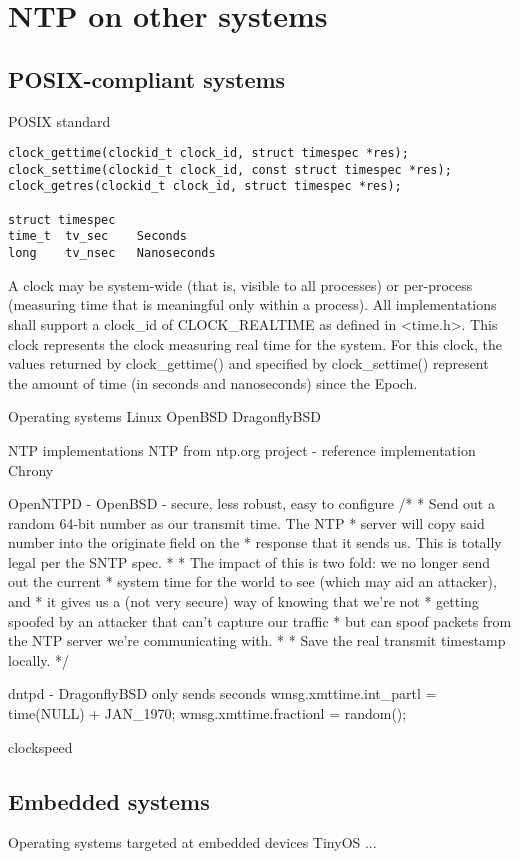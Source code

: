 
\chapter{NTP on other systems}

\section{POSIX-compliant systems}
POSIX standard
\begin{lstlisting}[morekeywords={clockid_t,time_t},numbers=none]
clock_gettime(clockid_t clock_id, struct timespec *res);
clock_settime(clockid_t clock_id, const struct timespec *res);
clock_getres(clockid_t clock_id, struct timespec *res);

struct timespec
time_t  tv_sec    Seconds
long    tv_nsec   Nanoseconds
\end{lstlisting}
A clock may be system-wide (that is, visible to all processes)
or per-process (measuring time that is meaningful only within a process).
All implementations shall support a clock\_id of CLOCK\_REALTIME as
defined in <time.h>.
This clock represents the clock measuring real time for the system.
For this clock, the values returned by clock\_gettime() and specified
by clock\_settime() represent the amount
of time (in seconds and nanoseconds) since the Epoch.


Operating systems
Linux
OpenBSD
DragonflyBSD

NTP implementations
NTP from ntp.org project - reference implementation
Chrony

OpenNTPD - OpenBSD - secure, less robust, easy to configure
	/*
	 * Send out a random 64-bit number as our transmit time.  The NTP
	 * server will copy said number into the originate field on the
	 * response that it sends us.  This is totally legal per the SNTP spec.
	 *
	 * The impact of this is two fold: we no longer send out the current
	 * system time for the world to see (which may aid an attacker), and
	 * it gives us a (not very secure) way of knowing that we're not
	 * getting spoofed by an attacker that can't capture our traffic
	 * but can spoof packets from the NTP server we're communicating with.
	 *
	 * Save the real transmit timestamp locally.
	 */

dntpd - DragonflyBSD
only sends seconds
    wmsg.xmttime.int_partl = time(NULL) + JAN_1970;
    wmsg.xmttime.fractionl = random();


clockspeed

\section{Embedded systems}
Operating systems targeted at embedded devices
TinyOS
...
